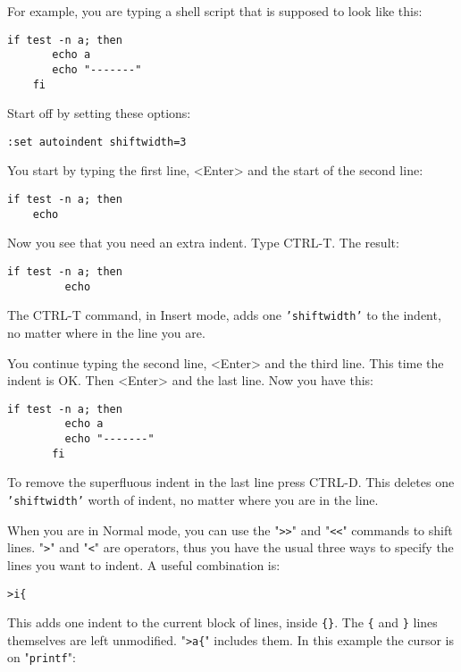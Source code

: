 {For example, you are typing a shell script that is supposed to look like this:

\begin{Verbatim}[samepage=true]
    if test -n a; then 
       echo a 
       echo "-------" 
    fi 
\end{Verbatim}

Start off by setting these options:

\begin{Verbatim}[samepage=true]
 :set autoindent shiftwidth=3
\end{Verbatim}

You start by typing the first line, <Enter> and the start of the second line:

\begin{Verbatim}[samepage=true]
    if test -n a; then 
    echo 
\end{Verbatim}

Now you see that you need an extra indent.
Type CTRL-T.
The result:

\begin{Verbatim}[samepage=true]
    if test -n a; then 
         echo 
\end{Verbatim}

The CTRL-T command, in Insert mode, adds one \texttt{'shiftwidth'} to the indent, no matter where in the line you are.

You continue typing the second line, <Enter> and the third line.
This time the indent is OK.
Then <Enter> and the last line.
Now you have this:

\begin{Verbatim}[samepage=true]
    if test -n a; then 
         echo a 
         echo "-------" 
       fi 
\end{Verbatim}

To remove the superfluous indent in the last line press CTRL-D.
This deletes one \texttt{'shiftwidth'} worth of indent, no matter where you are in the line.

When you are in Normal mode, you can use the "\texttt{>>}" and "\texttt{<<}" commands to shift lines.
"\texttt{>}" and "\texttt{<}" are operators, thus you have the usual three ways to specify the lines you want to indent.
A useful combination is:

\begin{Verbatim}[samepage=true]
 >i{
\end{Verbatim}

This adds one indent to the current block of lines, inside \texttt{\{\}}.
The \texttt{\{} and \texttt{\}} lines themselves are left unmodified.
"\texttt{>a\{}" includes them.
In this example the cursor is on "\texttt{printf}":

}
